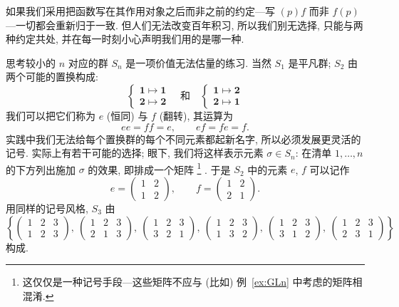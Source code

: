 如果我们采用把函数写在其作用对象之后而非之前的约定---写 $(p)f$ 而非 $f(p)$---一切都会重新归于一致. 但人们无法改变百年积习, 所以我们别无选择, 只能与两种约定共处, 并在每一时刻小心声明我们用的是哪一种.

思考较小的 $n$ 对应的群 $S_n$ 是一项价值无法估量的练习. 当然 $S_1$ 是平凡群; $S_2$ 由两个可能的置换构成:
\[
\left\{ \begin{array}{l} \mathbf{1} \mapsto \mathbf{1} \\ \mathbf{2} \mapsto \mathbf{2} \end{array} \right. \quad \text{和} \quad \left\{ \begin{array}{l} \mathbf{1} \mapsto \mathbf{2} \\ \mathbf{2} \mapsto \mathbf{1} \end{array} \right.
\]
我们可以把它们称为 $e$ (恒同) 与 $f$ (翻转), 其运算为
\[
ee = ff = e, \qquad ef = fe = f.
\]
实践中我们无法给每个置换群的每个不同元素都起新名字, 所以必须发展更灵活的记号. 实际上有若干可能的选择; 眼下, 我们将这样表示元素 $\sigma \in S_n$: 在清单 $1, \ldots, n$ 的下方列出施加 $\sigma$ 的效果, 即排成一个矩阵%
\footnote{这仅仅是一种记号手段---这些矩阵不应与 (比如) 例~\ref{ex:GLn} 中考虑的矩阵相混淆.}%
. 于是 $S_2$ 中的元素 $e$, $f$ 可以记作
\[
e = \begin{pmatrix} 1 & 2 \\ 1 & 2 \end{pmatrix}, \qquad f = \begin{pmatrix} 1 & 2 \\ 2 & 1 \end{pmatrix}.
\]
用同样的记号风格, $S_3$ 由
\[
\left\{ \begin{pmatrix} 1 & 2 & 3 \\ 1 & 2 & 3 \end{pmatrix},\ \begin{pmatrix} 1 & 2 & 3 \\ 2 & 1 & 3 \end{pmatrix},\ \begin{pmatrix} 1 & 2 & 3 \\ 3 & 2 & 1 \end{pmatrix},\ \begin{pmatrix} 1 & 2 & 3 \\ 1 & 3 & 2 \end{pmatrix},\ \begin{pmatrix} 1 & 2 & 3 \\ 3 & 1 & 2 \end{pmatrix},\ \begin{pmatrix} 1 & 2 & 3 \\ 2 & 3 & 1 \end{pmatrix} \right\}
\]
构成.

